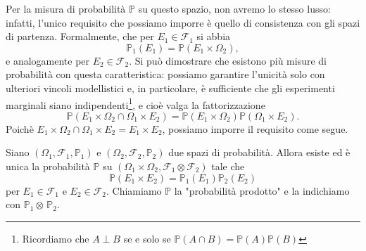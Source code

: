 Per la misura di probabilità $\mathbb{P}$ su questo spazio, non avremo lo stesso lusso: infatti, l'unico requisito che possiamo imporre è quello di consistenza con gli spazi di partenza. 
Formalmente, che per $E_1 \in \mathcal{F}_1$ si abbia
\[
	\mathbb{P}_1(E_1) = \mathbb{P} (E_1 \times \Omega_2),
\]
e analogamente per $E_2 \in \mathcal{F}_2$. 
Si può dimostrare che esistono più misure di probabilità con questa caratteristica: possiamo garantire l'unicità solo con ulteriori vincoli modellistici e, in particolare, è sufficiente che gli esperimenti marginali siano indipendenti\footnote{Ricordiamo che $A \perp B$ se e solo se $\mathbb{P}(A \cap B) = \mathbb{P}(A) \mathbb{P}(B)$}, e cioè valga la fattorizzazione
\[
	\mathbb{P} (E_1 \times \Omega_2 \cap \Omega_1 \times E_2) = \mathbb{P} (E_1 \times \Omega_2) \mathbb{P} (\Omega_1 \times E_2).
\]
Poichè $E_1 \times \Omega_2 \cap \Omega_1 \times E_2 = E_1 \times E_2$, possiamo imporre il requisito come segue.
\begin{my_theorem}
	Siano $\left( \Omega_1, \mathcal{F}_1, \mathbb{P}_1 \right)$ e $\left( \Omega_2, \mathcal{F}_2, \mathbb{P}_2 \right)$ due spazi di probabilità. 
	Allora esiste ed è unica la probabilità $\mathbb{P}$ su $\left(\Omega_1 \times \Omega_2, \mathcal{F}_1 \otimes \mathcal{F}_2\right)$ tale che
	\[
		\mathbb{P} (E_1 \times E_2) = \mathbb{P}_1 (E_1) \mathbb{P}_2 (E_2)
	\]
	per $E_1 \in \mathcal{F}_1$ e $E_2 \in \mathcal{F}_2$. 
	Chiamiamo $\mathbb{P}$ la "probabilità prodotto" e la indichiamo con $\mathbb{P}_1 \otimes \,\mathbb{P}_2$.
\end{my_theorem}

